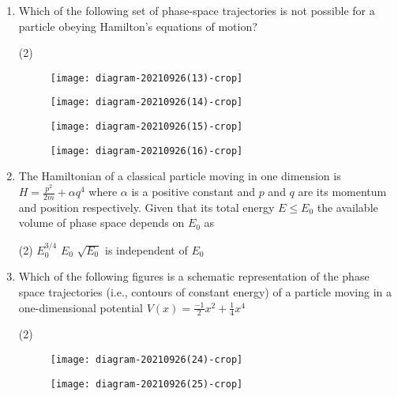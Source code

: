\begin{enumerate}
	\item Which of the following set of phase-space trajectories is not possible for a particle obeying Hamilton's equations of motion?
	{}
\begin{tasks}(2)
	\task[\textbf{A.}]\begin{figure}[H]
		\centering
		\texttt{[image: diagram-20210926(13)-crop]}
	\end{figure}
	\task[\textbf{B.}]\begin{figure}[H]
		\centering
		\texttt{[image: diagram-20210926(14)-crop]}
	\end{figure}
	\task[\textbf{C.}]\begin{figure}[H]
		\centering
		\texttt{[image: diagram-20210926(15)-crop]}
	\end{figure}
	\task[\textbf{D.}]\begin{figure}[H]
		\centering
		\texttt{[image: diagram-20210926(16)-crop]}
	\end{figure}
\end{tasks}
	\item The Hamiltonian of a classical particle moving in one dimension is $H=\frac{p^{2}}{2 m}+\alpha q^{4}$ where $\alpha$ is a positive constant and $p$ and $q$ are its momentum and position respectively. Given that its total energy $E \leq E_{0}$ the available volume of phase space depends on $E_{0}$ as
	{}
\begin{tasks}(2)
	\task[\textbf{A.}] $E_{0}^{3 / 4}$
	\task[\textbf{B.}]$E_{0}$
	\task[\textbf{C.}]$\sqrt{E_{0}}$
	\task[\textbf{D.}]is independent of $E_{0}$
\end{tasks}
	\item Which of the following figures is a schematic representation of the phase space trajectories (i.e., contours of constant energy) of a particle moving in a one-dimensional potential $V(x)=\frac{-1}{2} x^{2}+\frac{1}{4} x^{4}$
	{}
\begin{tasks}(2)
	\task[\textbf{A.}]\begin{figure}[H]
		\centering
		\texttt{[image: diagram-20210926(24)-crop]}
	\end{figure}
	\task[\textbf{B.}]\begin{figure}[H]
		\centering
		\texttt{[image: diagram-20210926(25)-crop]}
	\end{figure}
	\task[\textbf{C.}]\begin{figure}[H]

\end{figure}
\end{tasks}
\end{enumerate}
